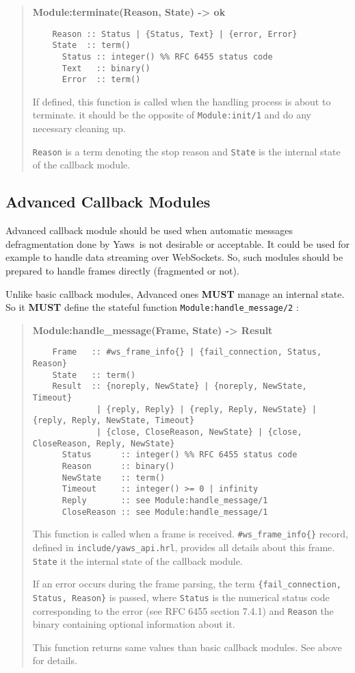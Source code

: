 \documentclass[11pt,oneside,english]{book}
\newcommand{\Yaws}            %
        {{\sc Yaws}}
\begin{document}
\begin{quote}
  \textbf{Module:terminate(Reason, State) -> ok}
\begin{verbatim}
    Reason :: Status | {Status, Text} | {error, Error}
    State  :: term()
      Status :: integer() %% RFC 6455 status code
      Text   :: binary()
      Error  :: term()
\end{verbatim}

  If defined, this function is called when the handling process is about to
  terminate. it should be the opposite of \verb+Module:init/1+ and do any
  necessary cleaning up.

  \verb+Reason+ is a term denoting the stop reason and \verb+State+ is the
  internal state of the callback module.
\end{quote}


\subsection{Advanced Callback Modules}

Advanced callback module should be used when automatic messages defragmentation
done by \Yaws\ is not desirable or acceptable. It could be used for example to
handle data streaming over WebSockets. So, such modules should be prepared to
handle frames directly (fragmented or not).

Unlike basic callback modules, Advanced ones \textbf{MUST} manage an internal
state. So it \textbf{MUST} define the stateful function
\verb+Module:handle_message/2+ :

\begin{quote}
  \textbf{Module:handle\_message(Frame, State) -> Result}
\begin{verbatim}
    Frame   :: #ws_frame_info{} | {fail_connection, Status, Reason}
    State   :: term()
    Result  :: {noreply, NewState} | {noreply, NewState, Timeout}
             | {reply, Reply} | {reply, Reply, NewState} | {reply, Reply, NewState, Timeout}
             | {close, CloseReason, NewState} | {close, CloseReason, Reply, NewState}
      Status      :: integer() %% RFC 6455 status code
      Reason      :: binary()
      NewState    :: term()
      Timeout     :: integer() >= 0 | infinity
      Reply       :: see Module:handle_message/1
      CloseReason :: see Module:handle_message/1
\end{verbatim}

  This function is called when a frame is received. \verb+#ws_frame_info{}+
  record, defined in \verb+include/yaws_api.hrl+, provides all details about
  this frame. \verb+State+ it the internal state of the callback module.

  If an error occurs during the frame parsing, the term
  \verb+{fail_connection, Status, Reason}+ is passed, where \verb+Status+ is the
  numerical status code corresponding to the error (see RFC 6455 section 7.4.1)
  and \verb+Reason+ the binary containing optional information about it.

  This function returns same values than basic callback modules. See above for
  details.
\end{quote}
\end{document}
